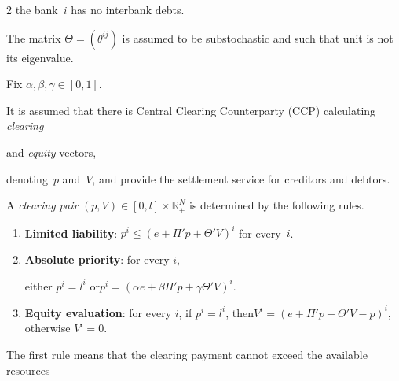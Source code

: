 \begin{multicols}{2}
the bank~$i$ has no interbank debts. 



The matrix $\Theta=(\theta^{ij})$ is assumed to be substochastic and such that unit is not its eigenvalue. 



 Fix $\alpha, \beta, \gamma \in [0,1]$.  

It is assumed that there is  Central Clearing Counterparty (CCP) calculating  \textit{clearing}\linebreak\vspace*{-12pt}



\pagebreak



\noindent

 and \textit{equity}  vectors, 

denoting~$p$ and~$V$, and provide  the settlement service for creditors and debtors.   



A \textit{clearing pair} $(p,V)\in [0,l]\times  \mathbb{R}^N_+$ is determined by the following rules.   

\begin{enumerate}[1.]

    \item


    {\bf Limited liability}: $p^i \leq (e + \Pi' p + \Theta' V)^i$ for every~$i$.

    \item


    {\bf Absolute priority}: for every $i$,

    either $p^i = l^i$ or\linebreak $p^i = \left(\alpha e + \beta \Pi' p + \gamma \Theta' V\right)^i$. 

    \item


    {\bf Equity evaluation}: for every $i$, if $p^i = l^i$, then\linebreak $V^i = \left(e + \Pi' p + \Theta' V - p\right)^i$, otherwise $V^i = 0$.

\end{enumerate}



The  first rule means that the clearing payment cannot exceed the available resources 


\end{multicols}
